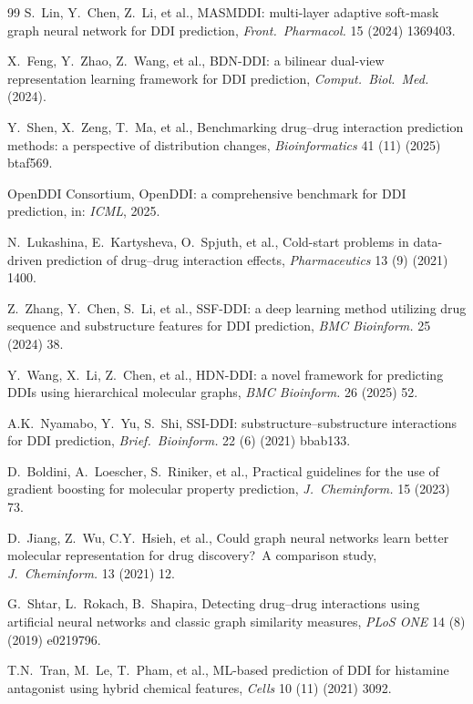 \documentclass[11pt,a4paper,twocolumn]{article}
\begin{document}
\begin{thebibliography}{99}
S.\ Lin, Y.\ Chen, Z.\ Li, et al.,
MASMDDI: multi-layer adaptive soft-mask graph neural network for DDI prediction,
\emph{Front.\ Pharmacol.} 15 (2024) 1369403.

X.\ Feng, Y.\ Zhao, Z.\ Wang, et al.,
BDN-DDI: a bilinear dual-view representation learning framework for DDI prediction,
\emph{Comput.\ Biol.\ Med.} (2024).

Y.\ Shen, X.\ Zeng, T.\ Ma, et al.,
Benchmarking drug--drug interaction prediction methods: a perspective of distribution changes,
\emph{Bioinformatics} 41 (11) (2025) btaf569.

OpenDDI Consortium,
OpenDDI: a comprehensive benchmark for DDI prediction,
in: \emph{ICML}, 2025.

N.\ Lukashina, E.\ Kartysheva, O.\ Spjuth, et al.,
Cold-start problems in data-driven prediction of drug--drug interaction effects,
\emph{Pharmaceutics} 13 (9) (2021) 1400.

Z.\ Zhang, Y.\ Chen, S.\ Li, et al.,
SSF-DDI: a deep learning method utilizing drug sequence and substructure features for DDI prediction,
\emph{BMC Bioinform.} 25 (2024) 38.

Y.\ Wang, X.\ Li, Z.\ Chen, et al.,
HDN-DDI: a novel framework for predicting DDIs using hierarchical molecular graphs,
\emph{BMC Bioinform.} 26 (2025) 52.

A.K.\ Nyamabo, Y.\ Yu, S.\ Shi,
SSI-DDI: substructure--substructure interactions for DDI prediction,
\emph{Brief.\ Bioinform.} 22 (6) (2021) bbab133.

D.\ Boldini, A.\ Loescher, S.\ Riniker, et al.,
Practical guidelines for the use of gradient boosting for molecular property prediction,
\emph{J.\ Cheminform.} 15 (2023) 73.

D.\ Jiang, Z.\ Wu, C.Y.\ Hsieh, et al.,
Could graph neural networks learn better molecular representation for drug discovery?\ A comparison study,
\emph{J.\ Cheminform.} 13 (2021) 12.

G.\ Shtar, L.\ Rokach, B.\ Shapira,
Detecting drug--drug interactions using artificial neural networks and classic graph similarity measures,
\emph{PLoS ONE} 14 (8) (2019) e0219796.

T.N.\ Tran, M.\ Le, T.\ Pham, et al.,
ML-based prediction of DDI for histamine antagonist using hybrid chemical features,
\emph{Cells} 10 (11) (2021) 3092.


\end{thebibliography}
\end{document}
